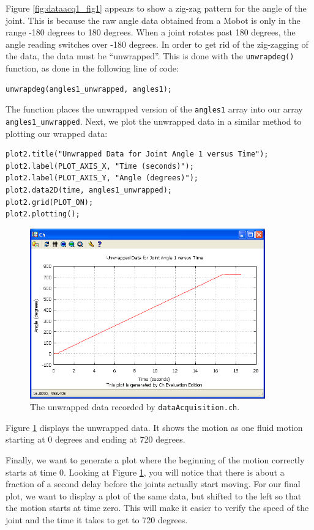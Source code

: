 \documentclass{article}
\begin{document}
Figure \ref{fig:dataacq1_fig1} appears to show
a zig-zag pattern for the angle of the joint. This is because the raw angle data obtained
from a Mobot is only in the range -180 degrees to 180 degrees. When a joint rotates
past 180 degrees, the angle reading switches over -180 degrees. In order to get rid of the
zig-zagging of the data, the data must be ``unwrapped''. This is done with the \texttt{unwrapdeg()}
function, as done in the following line of code:
\begin{verbatim}
unwrapdeg(angles1_unwrapped, angles1);
\end{verbatim}
The function places the unwrapped version of the \texttt{angles1} array into our array
\texttt{angles1\_unwrapped}. Next, we plot the unwrapped data in a similar method 
to plotting our wrapped data:
\begin{verbatim}
plot2.title("Unwrapped Data for Joint Angle 1 versus Time");
plot2.label(PLOT_AXIS_X, "Time (seconds)");
plot2.label(PLOT_AXIS_Y, "Angle (degrees)");
plot2.data2D(time, angles1_unwrapped);
plot2.grid(PLOT_ON);
plot2.plotting();
\end{verbatim}

\begin{figure}[H]
\centering
\includegraphics[width=4in]{images/dataacq1_plot2.png}
\caption{\label{fig:dataacq1_fig2} The unwrapped data recorded by \texttt{dataAcquisition.ch}.}
\end{figure}

Figure \ref{fig:dataacq1_fig2} displays the unwrapped data. It shows the motion as 
one fluid motion starting at 0 degrees and ending at 720 degrees. 

Finally, we want to generate a plot where the beginning of the motion correctly starts
at time 0. Looking at Figure \ref{fig:dataacq1_fig2}, you will notice that there is about
a fraction of a second delay before the joints actually start moving. For our final plot, we want
to display a plot of the same data, but shifted to the left so that the motion starts at
time zero. This will make it easier to verify the speed of the joint and the time it takes
to get to 720 degrees. 
\end{document}
